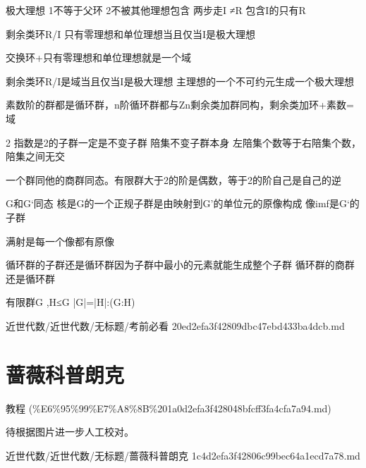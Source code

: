 \begin{note}[考前必看]
极大理想 1不等于父环 2不被其他理想包含 两步走I ≠R 包含I的只有R

剩余类环R/I 只有零理想和单位理想当且仅当I是极大理想

交换环+只有零理想和单位理想就是一个域

剩余类环R/I是域当且仅当I是极大理想 主理想的一个不可约元生成一个极大理想

素数阶的群都是循环群，n阶循环群都与Zn剩余类加群同构，剩余类加环+素数=域

2 指数是2的子群一定是不变子群 陪集不变子群本身 左陪集个数等于右陪集个数，陪集之间无交

一个群同他的商群同态。有限群大于2的阶是偶数，等于2的阶自己是自己的逆

G和G‘同态 核是G的一个正规子群是由映射到G’的单位元的原像构成 像imf是G‘的子群

满射是每一个像都有原像

循环群的子群还是循环群因为子群中最小的元素就能生成整个子群  循环群的商群还是循环群

有限群G ,H≤G |G|=|H|:(G:H)

\end{note}

\begin{note}[来源路径]

近世代数/近世代数/无标题/考前必看 20ed2efa3f42809dbc47ebd433ba4dcb.md

\end{note}

\section*{蔷薇科普朗克}

\begin{note}[来源上级主题]

教程 (\%E6\%95\%99\%E7\%A8\%8B\%201a0d2efa3f428048bfcff3fa4cfa7a94.md)

\end{note}

\begin{note}[蔷薇科普朗克]

待根据图片进一步人工校对。

\end{note}

\begin{note}[来源路径]

近世代数/近世代数/无标题/蔷薇科普朗克 1c4d2efa3f42806c99bec64a1ecd7a78.md

\end{note}

